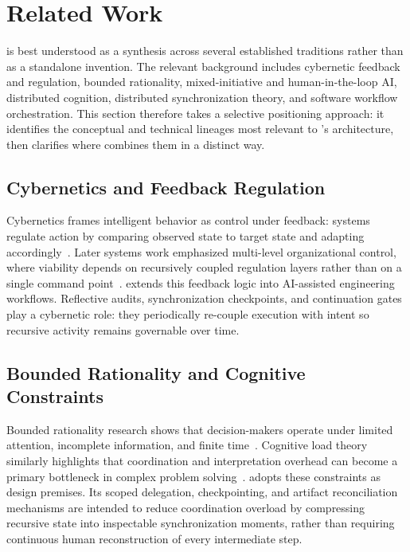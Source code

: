 \section{Related Work}
\label{sec:related-work}

 is best understood as a synthesis across several established traditions rather than as a standalone invention. The relevant background includes cybernetic feedback and regulation, bounded rationality, mixed-initiative and human-in-the-loop AI, distributed cognition, distributed synchronization theory, and software workflow orchestration. This section therefore takes a selective positioning approach: it identifies the conceptual and technical lineages most relevant to 's architecture, then clarifies where  combines them in a distinct way.

\subsection{Cybernetics and Feedback Regulation}

Cybernetics frames intelligent behavior as control under feedback: systems regulate action by comparing observed state to target state and adapting accordingly~\cite{Wiener1948Cybernetics}. Later systems work emphasized multi-level organizational control, where viability depends on recursively coupled regulation layers rather than on a single command point~\cite{Beer1972BrainFirm}.  extends this feedback logic into AI-assisted engineering workflows. Reflective audits, synchronization checkpoints, and continuation gates play a cybernetic role: they periodically re-couple execution with intent so recursive activity remains governable over time.

\subsection{Bounded Rationality and Cognitive Constraints}

Bounded rationality research shows that decision-makers operate under limited attention, incomplete information, and finite time~\cite{Simon1957ModelsMan}. Cognitive load theory similarly highlights that coordination and interpretation overhead can become a primary bottleneck in complex problem solving~\cite{Sweller1988CognitiveLoad}.  adopts these constraints as design premises. Its scoped delegation, checkpointing, and artifact reconciliation mechanisms are intended to reduce coordination overload by compressing recursive state into inspectable synchronization moments, rather than requiring continuous human reconstruction of every intermediate step.

